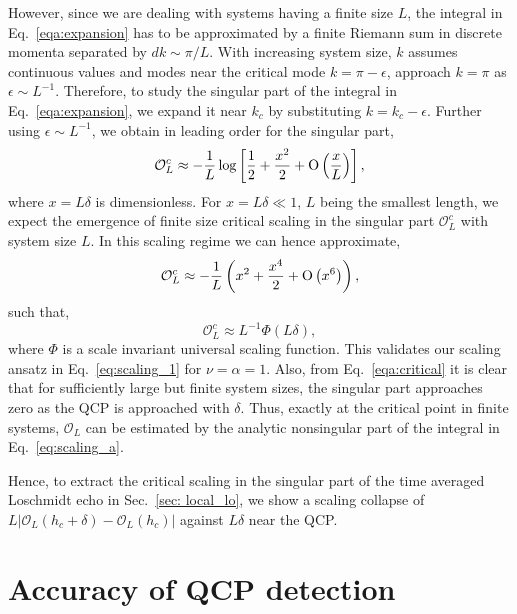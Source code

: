 \documentclass[aps,prx,twocolumn]{revtex4-2}
\begin{document}
{{However, since we are dealing with systems having a finite size $L$, the integral in Eq.~\eqref{eqa:expansion} has to be approximated by a finite Riemann sum in discrete momenta separated by $dk\sim\pi/L$. With increasing system size, $k$ assumes continuous values and modes near the critical mode $k=\pi-\epsilon$, approach $k=\pi$ as $\epsilon\sim L^{-1}$. 
Therefore, to study the singular part of the integral in Eq.~\eqref{eqa:expansion}, we expand it near $k_c$ by substituting $k=k_c-\epsilon$. Further using $\epsilon\sim L^{-1}$, we obtain in leading order for the singular part,
\begin{equation}\label{eqa:critical}
	\mathcal{O}_L^c\approx-\frac{1}{L}\log\left[\frac{1}{2}+\frac{x^2}{2}+{\rm O}\left(\frac{x}{L}\right)\right],
\end{equation}
where $x=L\delta$ is dimensionless. For $x=L \delta\ll 1$, $L$ being the smallest length, we expect the emergence of finite size critical scaling in the singular part  $\mathcal{O}_L^c$ with system size $L$. In this scaling regime we can hence approximate,
\begin{equation}
	\mathcal{O}_L^c\approx-\frac{1}{L}\left(x^2+\frac{x^4}{2}+{\rm O}\left(x^6\right)\right),
\end{equation}
such that,
\begin{equation}
	\mathcal{O}_L^c\approx L^{-1}\Phi(L\delta),
\end{equation}
where $\Phi$ is a scale invariant universal scaling function. This validates our scaling ansatz in Eq.~\eqref{eq:scaling_1} for $\nu=\alpha=1$. Also, from Eq.~\eqref{eqa:critical} it is clear that for sufficiently large but finite system sizes, the singular part approaches zero as the QCP is approached with $\delta$. Thus, exactly at the critical point in finite systems,  $\mathcal{O}_L$ can be estimated by the analytic nonsingular part of the integral in Eq.~\eqref{eq:scaling_a}.
\begin{comment}
\begin{equation}
	\mathcal{O}_L(h_c)\approx-\lim\limits_{\eta\rightarrow 0+}\frac{1}{\pi}\int_0^{\pi-\eta}\frac{\sin ^2(k)}{2 \cos (k)+2}dk.
\end{equation}
\end{comment}
Hence, to extract the critical scaling in the singular part of the time averaged Loschmidt echo in Sec.~\ref{sec: local_lo}, we show a scaling collapse of $L|\mathcal{O}_L(h_c+\delta)-\mathcal{O}_L(h_c)|$ against $L\delta$ near the QCP.

\section{Accuracy of QCP detection}
\label{Sec:sr_int}

}}
\end{document}
